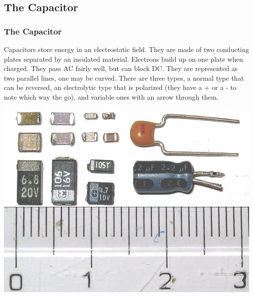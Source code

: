 \documentclass[10pt]{beamer}
\begin{document}
\subsection{The Capacitor}
\begin{frame}
\frametitle{The Capacitor}
Capacitors store energy in an electrostatic field. They are made of two conducting plates separated by an insulated material. Electrons build up on one plate when charged. They pass AC fairly well, but can block DC. They are represented as two parallel lines, one may be curved. There are three types, a normal type that can be reversed, an electrolytic type that is polarized (they have a + or a - to note which way the go), and variable ones with an arrow through them.\\\pause
\begin{center}
\includegraphics[height=.5\textheight]{capacitor.jpg}
\end{center}
\end{frame}
\end{document}
